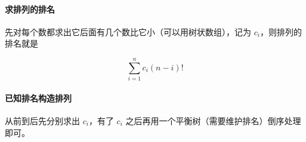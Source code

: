 \paragraph{求排列的排名} 先对每个数都求出它后面有几个数比它小（可以用树状数组），记为 $c_i$，则排列的排名就是

$$ \sum_{i = 1} ^ n c_i (n - i)! $$

\paragraph{已知排名构造排列} 从前到后先分别求出 $c_i$，有了 $c_i$ 之后再用一个平衡树（需要维护排名）倒序处理即可。
